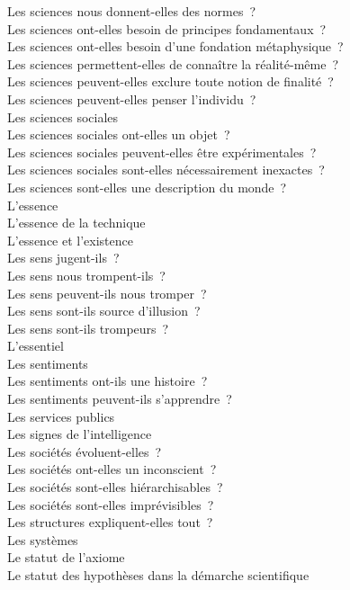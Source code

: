 \documentclass[a4paper,12pt]{article}
\begin{document}
Les sciences nous donnent-elles des normes ? \\
Les sciences ont-elles besoin de principes fondamentaux ? \\
Les sciences ont-elles besoin d'une fondation métaphysique ? \\
Les sciences permettent-elles de connaître la réalité-même ? \\
Les sciences peuvent-elles exclure toute notion de finalité ? \\
Les sciences peuvent-elles penser l'individu ? \\
Les sciences sociales \\
Les sciences sociales ont-elles un objet ? \\
Les sciences sociales peuvent-elles être expérimentales ? \\
Les sciences sociales sont-elles nécessairement inexactes ? \\
Les sciences sont-elles une description du monde ? \\
L'essence \\
L'essence de la technique \\
L'essence et l'existence \\
Les sens jugent-ils ? \\
Les sens nous trompent-ils ? \\
Les sens peuvent-ils nous tromper ? \\
Les sens sont-ils source d'illusion ? \\
Les sens sont-ils trompeurs ? \\
L'essentiel \\
Les sentiments \\
Les sentiments ont-ils une histoire ? \\
Les sentiments peuvent-ils s'apprendre ? \\
Les services publics \\
Les signes de l'intelligence \\
Les sociétés évoluent-elles ? \\
Les sociétés ont-elles un inconscient ? \\
Les sociétés sont-elles hiérarchisables ? \\
Les sociétés sont-elles imprévisibles ? \\
Les structures expliquent-elles tout ? \\
Les systèmes \\
Le statut de l'axiome \\
Le statut des hypothèses dans la démarche scientifique \\
\end{document}
